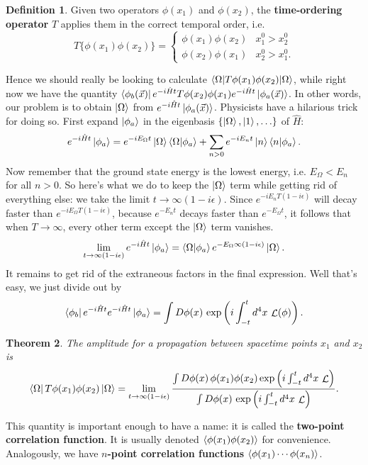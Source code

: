 \documentclass{report}
\theoremstyle{plain}
\newtheorem{theorem}{Theorem}[section]
\theoremstyle{definition}
\newtheorem{definition}[theorem]{Definition}
\theoremstyle{remark}
\DeclareMathOperator{\cL}{\mathcal{L}}
\begin{document}
\begin{definition}
  Given two operators $\phi(x_1)$ and $\phi(x_2)$, the {\bf
    time-ordering operator} $T$ applies them in the correct temporal
  order, i.e.
  $$ T\{\phi(x_1)\phi(x_2)\} = \begin{cases} \phi(x_1)\phi(x_2) & x_1^0 > x_2^0 \\ \phi(x_2)\phi(x_1) & x_2^0 > x_1^0. \end{cases} $$
\end{definition}

Hence we should really be looking to calculate
$\braket{\Omega|T\phi(x_1)\phi(x_2)|\Omega}$, while right now we have
the quantity
$\bra{\phi_b(\vec{x})} e^{-i\hat{H}t} T\phi(x_2)\phi(x_1)
e^{-i\hat{H}t} \ket{\phi_a(\vec{x})}$.
In other words, our problem is to obtain $\ket{\Omega}$ from
$e^{-i\hat{H}t} \ket{\phi_a(\vec{x})}$. Physicists have a hilarious
trick for doing so. First expand $\ket{\phi_a}$ in the eigenbasis
$\{\ket{\Omega}, \ket{1}, \ldots\}$ of $\hat{H}$:
$$ e^{-i\hat{H}t} \ket{\phi_a} = e^{-iE_{\Omega}t} \ket{\Omega} \braket{\Omega|\phi_a} + \sum_{n>0} e^{-iE_nt} \ket{n} \braket{n|\phi_a}. $$
Now remember that the ground state energy is the lowest energy, i.e.
$E_\Omega < E_n$ for all $n > 0$. So here's what we do to keep the
$\ket{\Omega}$ term while getting rid of everything else: we take the
limit $t \to \infty(1 - i\epsilon)$. Since
$e^{-iE_n T(1 - i\epsilon)}$ will decay faster than
$e^{-iE_\Omega T(1 - i\epsilon)}$, because $e^{-E_n t}$ decays faster
than $e^{-E_\Omega t}$, it follows that when $T \to \infty$, every
other term except the $\ket{\Omega}$ term vanishes.
$$ \lim_{t \to \infty(1 - i\epsilon)} e^{-i\hat{H}t} \ket{\phi_a} = \braket{\Omega|\phi_a} e^{-E_\Omega \infty (1 - i\epsilon)} \ket{\Omega}. $$
It remains to get rid of the extraneous factors in the final
expression. Well that's easy, we just divide out by
$$ \bra{\phi_b} e^{-i\hat{H}t} e^{-i\hat{H}t} \ket{\phi_a} = \int D\phi(x) \, \exp\left(i \int_{-t}^t d^4x \, \cL(\phi)\right). $$

\begin{theorem}
  The amplitude for a propagation between spacetime points $x_1$ and
  $x_2$ is
  $$ \bra{\Omega} T\phi(x_1)\phi(x_2) \ket{\Omega} = \lim_{t \to \infty(1 - i\epsilon)} \frac{\int D\phi(x) \, \phi(x_1) \phi(x_2) \exp\left(i \int_{-t}^t d^4x \, \cL\right)}{\int D\phi(x) \, \exp\left(i \int_{-t}^t d^4x \, \cL\right)}. $$
\end{theorem}

This quantity is important enough to have a name: it is called the
{\bf two-point correlation function}. It is usually denoted
$\braket{\phi(x_1)\phi(x_2)}$ for convenience. Analogously, we have
{\bf $n$-point correlation functions}
$\braket{\phi(x_1) \cdots \phi(x_n)}$.
\end{document}
